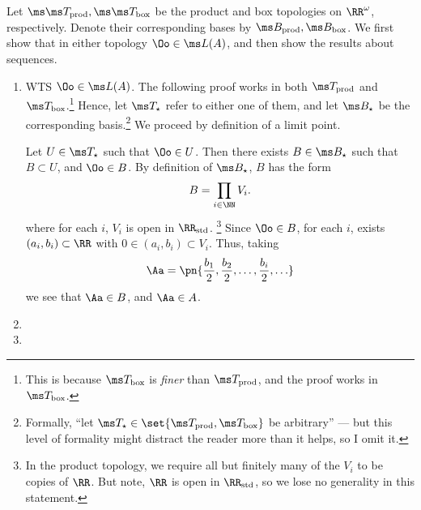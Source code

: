 \documentclass{fkpset}
\newcommand{\tprod}{\ensuremath \ms T_{\rm prod}}
\newcommand{\bprod}{\ensuremath \ms B_{\rm prod}}
\newcommand{\tbox}{\ensuremath \ms T_{\rm box}}
\newcommand{\bbox}{\ensuremath \ms B_{\rm box}}
\newcommand{\tstar}{\ensuremath \ms T_{\star}}
\newcommand{\bstar}{\ensuremath \ms B_{\star}}
\begin{document}
  \begin{solution}
    Let $\ms \tprod, \ms \tbox$ be the product and box topologies on
    $\RR^\omega$, respectively. Denote their corresponding bases by
    $\bprod, \bbox$. We first show that in either topology $\Oo \in
    \ms L(A)$, and then show the results about sequences.
    \begin{enumerate}[label=(\arabic*)]
      \item WTS $\Oo \in \ms L(A)$. The following proof works in both
        $\tprod$ and $\tbox$.\footnote{This is because $\tbox$ is
          \emph{finer} than $\tprod$, and the proof works in $\tbox$.}
        Hence, let $\tstar$ refer to either one of them, and let
        $\bstar$ be the corresponding basis.\footnote{Formally, ``let
          $\tstar \in \set{\tprod, \tbox}$ be arbitrary'' --- but this
          level of formality might distract the reader more than it
          helps, so I omit it.} We proceed by definition of a limit
        point.

        Let $U \in \tstar$ such that $\Oo \in U$. Then there exists $B
        \in \bstar$ such that $B \subset U$, and $\Oo \in B$. By
        definition of $\ms B_\star$, $B$ has the form
        \[
          B = \prod_{i \in \NN} V_i.
        \]
        where for each $i$, $V_i$ is open in $\RR_{\rm std}$.%
        \footnote{In the product topology, we require all but
          finitely many of the $V_i$ to be copies of $\RR$. But note,
          $\RR$ is open in $\RR_{\rm std}$, so we lose no generality
          in this statement.} Since $\Oo \in B$, for each $i$, exists
        $(a_i, b_i) \subset \RR$ with $0 \in (a_i,b_i) \subset V_i$.
        Thus, taking
        \[
          \Aa = \pn{\frac{b_1}{2}, \frac{b_2}{2}, \ldots,
            \frac{b_i}{2}, \ldots}
        \]
        we see that $\Aa \in B$, and $\Aa \in A$.
      \item
      \item
    \end{enumerate}
  \end{solution}
  \clearpage
\end{document}
